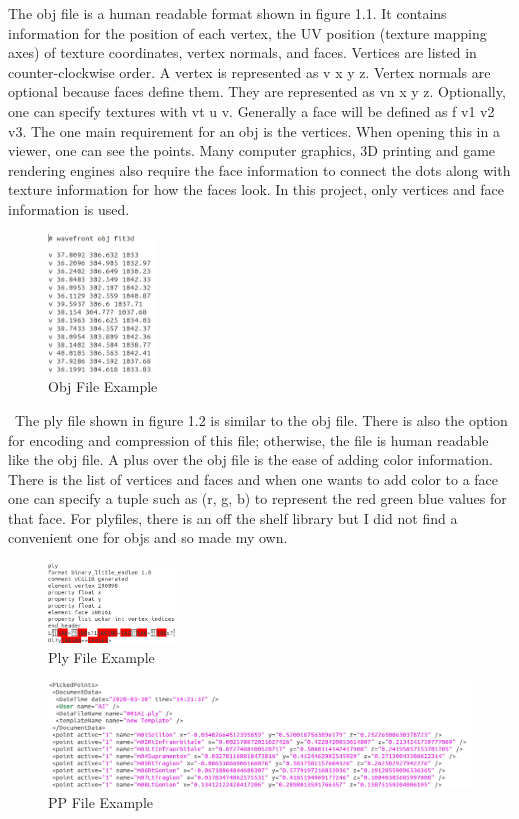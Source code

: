 The obj file is a human readable format shown in figure 1.1. It contains information for the position of each vertex, the UV position (texture mapping axes) of texture coordinates, vertex normals, and faces. Vertices are listed in counter-clockwise order. A vertex is represented as v x y z. Vertex normals are optional because faces define them. They are represented as vn x y z. Optionally, one can specify textures with vt u v. Generally a face will be defined as f v1 v2 v3. The one main requirement for an obj is the vertices. When opening this in a viewer, one can see the points. Many computer graphics, 3D printing and game rendering engines also require the face information to connect the dots along with texture information for how the faces look. In this project, only vertices and face information is used.
\begin{figure}[!htb]
	\caption{Obj File Example}
	\centering
	\includegraphics[width=0.25\textwidth]{images/obj_file.png}
\end{figure}
\
The ply file shown in figure 1.2 is similar to the obj file. There is also the option for encoding and compression of this file; otherwise, the file is human readable like the obj file. A plus over the obj file is the ease of adding color information. There is the list of vertices and faces and when one wants to add color to a face one can specify a tuple such as (r, g, b) to represent the red green blue values for that face. For plyfiles, there is an off the shelf library but I did not find a convenient one for objs and so made my own. 

\begin{figure}[!htb]
	\caption{Ply File Example}
	\centering
	\includegraphics[width=0.3\textwidth]{images/ply_file.png}
\end{figure}
\begin{figure}[!htb]
	\caption{PP File Example}
	\centering
	\includegraphics[width=1.1\textwidth]{images/pp_file.png}
\end{figure}


